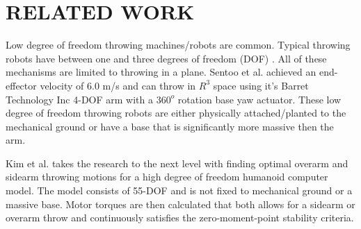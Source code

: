 \section{RELATED WORK}

Low degree of freedom throwing machines/robots are common.  Typical throwing robots have between one and three degrees of freedom (DOF) \cite{509405, Lynch97dynamicnonprehensile, 5152525, 509335, springerlink:10.1007/s10015-006-0401-0}.  All of these mechanisms are limited to throwing in a plane.   Sentoo et al.\cite{4651142} achieved an end-effector velocity of 6.0 m/s and can throw in $R^3$ space using it's Barret Technology Inc 4-DOF arm with a $360^o$ rotation base yaw actuator.  These low degree of freedom throwing robots are either physically attached/planted to the mechanical ground or have a base that is significantly more massive then the arm.  

Kim et al. \cite{JooH2011438} takes the research to the next level with finding optimal overarm and sidearm throwing motions for a high degree of freedom humanoid computer model.  The model consists of 55-DOF and is not fixed to mechanical ground or a massive base.  Motor torques are then calculated that both allows for a sidearm or overarm throw and continuously satisfies the zero-moment-point stability criteria\cite{4309277}.  



